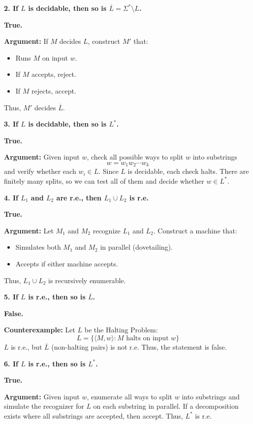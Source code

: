 \documentclass{article}
\theoremstyle{theorem}
\theoremstyle{definition}
\theoremstyle{remark}
\begin{document}
\bigskip

\textbf{2. If $L$ is decidable, then so is $\overline{L} = \Sigma^* \setminus L$.}

\textbf{True.}

\textbf{Argument:}  
If $M$ decides $L$, construct $M'$ that:
\begin{itemize}
    \item Runs $M$ on input $w$.
    \item If $M$ accepts, reject.
    \item If $M$ rejects, accept.
\end{itemize}
Thus, $M'$ decides $\overline{L}$.

\bigskip

\textbf{3. If $L$ is decidable, then so is $L^*$.}

\textbf{True.}

\textbf{Argument:}  
Given input $w$, check all possible ways to split $w$ into substrings
\[
w = w_1 w_2 \cdots w_k
\]
and verify whether each $w_i \in L$. Since $L$ is decidable, each check halts.  
There are finitely many splits, so we can test all of them and decide whether $w \in L^*$.

\bigskip

\textbf{4. If $L_1$ and $L_2$ are r.e., then $L_1 \cup L_2$ is r.e.}

\textbf{True.}

\textbf{Argument:}  
Let $M_1$ and $M_2$ recognize $L_1$ and $L_2$. Construct a machine that:
\begin{itemize}
    \item Simulates both $M_1$ and $M_2$ in parallel (dovetailing).
    \item Accepts if either machine accepts.
\end{itemize}
Thus, $L_1 \cup L_2$ is recursively enumerable.

\bigskip

\textbf{5. If $L$ is r.e., then so is $\overline{L}$.}

\textbf{False.}

\textbf{Counterexample:}  
Let $L$ be the Halting Problem:
\[
L = \{ \langle M,w \rangle : M \text{ halts on input } w \}
\]
$L$ is r.e., but $\overline{L}$ (non-halting pairs) is not r.e.  
Thus, the statement is false.

\bigskip

\textbf{6. If $L$ is r.e., then so is $L^*$.}

\textbf{True.}

\textbf{Argument:}  
Given input $w$, enumerate all ways to split $w$ into substrings and simulate the recognizer for $L$ on each substring in parallel.  
If a decomposition exists where all substrings are accepted, then accept.  
Thus, $L^*$ is r.e.
\end{document}
